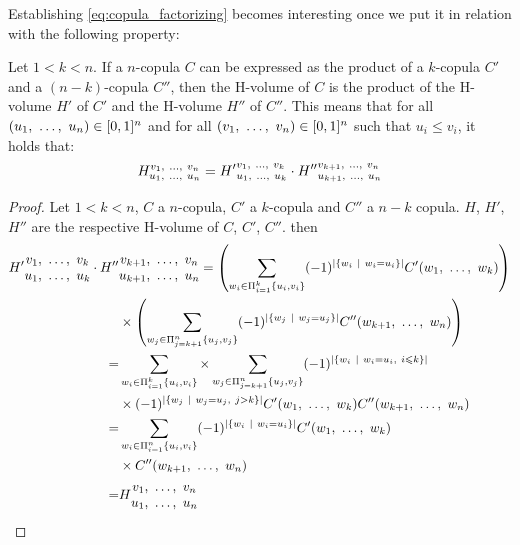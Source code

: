 Establishing \cref{eq:copula_factorizing} becomes interesting once we put it in relation with the following property:
\begin{proposition}\label{prop:hvol_factorizing}
    Let $1<k<n$. If a $n$-copula $C$ can be expressed as the product of a $k$-copula $C'$ and a $(n-k)$-copula $C''$, then the H-volume of $C$ is the product of the H-volume $H'$ of $C'$ and the H-volume $H''$ of $C''$. This means that for all $(u_1 , ~\dots, ~ u_n)\in[0,1]^n$ and for all $(v_1 , ~\dots, ~ v_n)\in[0,1]^n$ such that $u_i\leqslant v_i$, it holds that:
    \begin{align}
        H_{u_1 , ~\dots, ~ u_n}^{v_1 , ~\dots, ~ v_n} = {H'}_{u_1 , ~\dots, ~ u_k}^{v_1 , ~\dots, ~ v_k}\cdot{H''}_{u_{k+1} , ~\dots, ~ u_n}^{v_{k+1} , ~\dots, ~ v_n}
    \end{align}
\end{proposition}
\begin{proof}
    Let $1<k<n$, $C$ a $n$-copula, $C'$ a $k$-copula and $C''$ a $n-k$ copula. $H$, $H'$, $H''$ are the respective H-volume of $C$, $C'$, $C''$. then
    \begin{align*}
        {H'}
        \begin{matrix}
            v_1 , ~\dots, ~  v_k\\
            u_1 , ~\dots, ~  u_k
        \end{matrix}
        \cdot {H''}&
        \begin{matrix}
            v_{k+1} , ~\dots, ~  v_n\\
            u_{k+1} , ~\dots, ~  u_n
        \end{matrix}= \left(\sum_{w_i\in\Pi_{i=1}^{k}\{u_i,v_i\}}(-1)^{|\{w_i~|~w_i=u_i\}|}C'(w_1 , ~\dots, ~ w_k)\right)\\
        &\times\left(\sum_{w_j\in\Pi_{j=k+1}^{n}\{u_j,v_j\}}(-1)^{|\{w_j~|~w_j=u_j\}|}C''(w_{k+1} , ~\dots, ~ w_n)\right)\\
        =& \sum_{w_i\in\Pi_{i=1}^{k}\{u_i,v_i\}}\times\sum_{w_j\in\Pi_{j=k+1}^{n}\{u_j,v_j\}}(-1)^{|\{w_i~|~w_i=u_i,~i\leqslant k\}|}\\
        &\times(-1)^{|\{w_j~|~w_j=u_j,~ j>k\}|}C'(w_1 , ~\dots, ~ w_k)C''(w_{k+1} , ~\dots, ~ w_n)\\
        =&\sum_{w_i\in\Pi_{i=1}^{n}\{u_i,v_i\}}(-1)^{|\{w_i~|~w_i=u_i\}|}C'(w_1 , ~\dots, ~ w_k)\\
        &\times C''(w_{k+1} , ~\dots, ~ w_n)\\
        =&H
        \begin{matrix}
            v_1 , ~\dots, ~  v_n\\
            u_1 , ~\dots, ~  u_n
        \end{matrix}
    \end{align*}
\end{proof}
